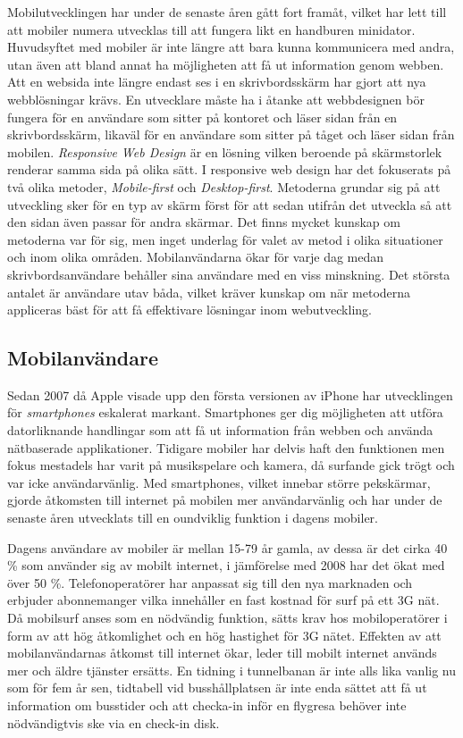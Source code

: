 \documentclass[11pt]{article}
\begin{document}
Mobilutvecklingen har under de senaste åren gått fort framåt, vilket har lett till att mobiler numera utvecklas till att fungera likt en handburen minidator. Huvudsyftet med mobiler är inte längre att bara kunna kommunicera med andra, utan även att bland annat ha möjligheten att få ut information genom webben. Att en websida inte längre endast ses i en skrivbordsskärm har gjort att nya webblösningar krävs. En utvecklare måste ha i åtanke att webbdesignen bör fungera för en användare som sitter på kontoret och läser sidan från en skrivbordsskärm, likaväl för en användare som sitter på tåget och läser sidan från mobilen. \textit{Responsive Web Design} är en lösning vilken beroende på skärmstorlek renderar\nocite{TestSwarm} samma sida på olika sätt. I responsive web design har det fokuserats på två olika metoder, \textit{Mobile-first} och \textit{Desktop-first}. Metoderna grundar sig på att utveckling sker för en typ av skärm först för att sedan utifrån det utveckla så att den sidan även passar för andra skärmar. Det finns mycket kunskap om metoderna var för sig, men inget underlag för valet av metod i olika situationer och inom olika områden. Mobilanvändarna ökar för varje dag medan skrivbordsanvändare behåller sina användare med en viss minskning. Det största antalet är användare utav båda, vilket kräver kunskap om när \nocite{test} metoderna appliceras bäst för att få effektivare lösningar inom webutveckling.

\subsection{Mobilanvändare}

Sedan 2007 då Apple visade upp den första versionen av iPhone har utvecklingen för \textit{smartphones} eskalerat markant. Smartphones ger dig möjligheten att utföra datorliknande handlingar som att få ut information från webben och använda nätbaserade applikationer. Tidigare mobiler har delvis haft den funktionen men fokus mestadels har varit på musikspelare och kamera, då surfande gick trögt och var icke användarvänlig.
Med smartphones, vilket innebar större pekskärmar, gjorde åtkomsten till internet på mobilen mer användarvänlig och har under de senaste åren utvecklats till en oundviklig funktion i dagens mobiler.


Dagens användare av mobiler är mellan 15-79 år gamla, av dessa är det cirka 40 \% som använder sig av mobilt internet, i jämförelse med 2008 har det ökat med över 50 \%. Telefonoperatörer har anpassat sig till den nya marknaden och erbjuder abonnemanger vilka innehåller en fast kostnad för surf på ett 3G nät. Då mobilsurf anses som en nödvändig funktion, sätts krav hos mobiloperatörer i form av att hög åtkomlighet och en hög hastighet för 3G nätet. Effekten av att mobilanvändarnas åtkomst till internet ökar, leder till mobilt internet används mer och äldre tjänster ersätts. En tidning i tunnelbanan är inte alls lika vanlig nu som för fem år sen, tidtabell vid busshållplatsen är inte enda sättet att få ut information om busstider och att checka-in inför en flygresa behöver inte nödvändigtvis ske via en check-in disk.
\end{document}
